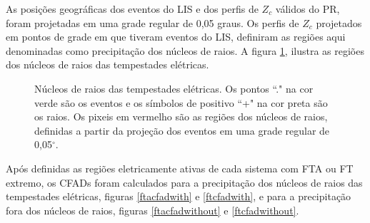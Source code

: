 As posições geográficas dos eventos do LIS e dos perfis de $Z_c$ válidos do PR, foram projetadas em uma grade regular de 0,05 graus. Os perfis de $Z_c$ projetados em pontos de grade em que tiveram eventos do LIS, definiram as regiões aqui denominadas como precipitação dos núcleos de raios. A figura \ref{nucleosRaios}, ilustra as regiões dos núcleos de raios das tempestades elétricas.


\begin{figure}[!htb]
  \caption{Núcleos de raios das tempestades elétricas. Os pontos ``." na cor  verde são os eventos e os símbolos de positivo ``+" na cor preta são os raios. Os pixeis em vermelho são as regiões dos núcleos de raios, definidas a partir da projeção dos eventos em uma grade regular de 0,05$^{\circ}$.} %
\label{nucleosRaios}
\end{figure}



Após definidas as regiões eletricamente ativas de cada sistema com FTA ou FT extremo, os CFADs foram calculados para a precipitação dos núcleos de raios das tempestades elétricas, figuras \ref{ftacfadwith} e \ref{ftcfadwith}, e para a precipitação fora dos núcleos de raios, figuras \ref{ftacfadwithout} e \ref{ftcfadwithout}.


